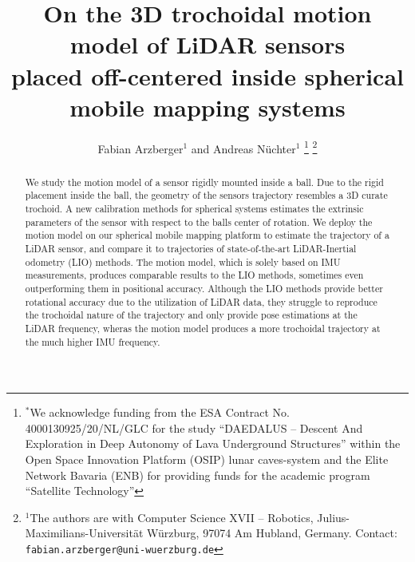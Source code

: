 \documentclass[a4paper, 10pt, conference]{ieeeconf}      %
\title{\LARGE \bf
On the 3D trochoidal motion model of LiDAR sensors\\placed off-centered inside spherical mobile mapping systems
}
\author{Fabian Arzberger$^{1}$ and Andreas N{\"u}chter$^{1}$%
\thanks{$^{*}$We acknowledge funding from the ESA Contract No. 4000130925/20/NL/GLC for the study ``DAEDALUS -- Descent And Exploration in Deep Autonomy of Lava Underground Structures'' within the Open Space Innovation Platform (OSIP) lunar caves-system and the Elite Network Bavaria (ENB) for providing funds for the academic program ``Satellite Technology''}%
\thanks{$^{1}$The authors are with Computer Science XVII -- Robotics,
        Julius-Maximilians-Universit{\"a}t W{\"u}rzburg, 97074 Am Hubland, Germany.
        {Contact: \tt\small fabian.arzberger@uni-wuerzburg.de}}%
}
\begin{document}
\maketitle
\thispagestyle{empty}
\pagestyle{empty}


\begin{abstract}
We study the motion model of a sensor rigidly mounted inside a ball.
Due to the rigid placement inside the ball, the geometry of the sensors trajectory resembles a 3D curate trochoid.
A new calibration methods for spherical systems estimates the extrinsic parameters of the sensor with respect to the balls center of rotation.
We deploy the motion model on our spherical mobile mapping platform to estimate the trajectory of a LiDAR sensor, and compare it to trajectories of state-of-the-art LiDAR-Inertial odometry (LIO) methods.
The motion model, which is solely based on IMU measurements, produces comparable results to the LIO methods, sometimes even outperforming them in positional accuracy.
Although the LIO methods provide better rotational accuracy due to the utilization of LiDAR data, they struggle to reproduce the trochoidal nature of the trajectory and only provide pose estimations at the LiDAR frequency, wheras the motion model produces a more trochoidal trajectory at the much higher IMU frequency.  
\end{abstract}






% 






\end{document}

